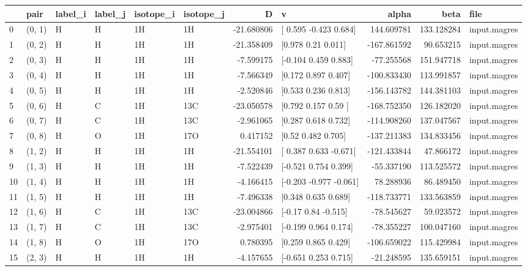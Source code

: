 \begin{tabular}{llllllrlrrl}
\toprule
 & pair & label_i & label_j & isotope_i & isotope_j & D & v & alpha & beta & file \\
\midrule
0 & (0, 1) & H & H & 1H & 1H & -21.680806 & [ 0.595 -0.423  0.684] & 144.609781 & 133.128284 & input.magres \\
1 & (0, 2) & H & H & 1H & 1H & -21.358409 & [0.978 0.21  0.011] & -167.861592 & 90.653215 & input.magres \\
2 & (0, 3) & H & H & 1H & 1H & -7.599175 & [-0.104  0.459  0.883] & -77.255568 & 151.947718 & input.magres \\
3 & (0, 4) & H & H & 1H & 1H & -7.566349 & [0.172 0.897 0.407] & -100.833430 & 113.991857 & input.magres \\
4 & (0, 5) & H & H & 1H & 1H & -2.520846 & [0.533 0.236 0.813] & -156.143782 & 144.381103 & input.magres \\
5 & (0, 6) & H & C & 1H & 13C & -23.050578 & [0.792 0.157 0.59 ] & -168.752350 & 126.182020 & input.magres \\
6 & (0, 7) & H & C & 1H & 13C & -2.961065 & [0.287 0.618 0.732] & -114.908260 & 137.047567 & input.magres \\
7 & (0, 8) & H & O & 1H & 17O & 0.417152 & [0.52  0.482 0.705] & -137.211383 & 134.833456 & input.magres \\
8 & (1, 2) & H & H & 1H & 1H & -21.554101 & [ 0.387  0.633 -0.671] & -121.433844 & 47.866172 & input.magres \\
9 & (1, 3) & H & H & 1H & 1H & -7.522439 & [-0.521  0.754  0.399] & -55.337190 & 113.525572 & input.magres \\
10 & (1, 4) & H & H & 1H & 1H & -4.166415 & [-0.203 -0.977 -0.061] & 78.288936 & 86.489450 & input.magres \\
11 & (1, 5) & H & H & 1H & 1H & -7.496338 & [0.348 0.635 0.689] & -118.733771 & 133.563859 & input.magres \\
12 & (1, 6) & H & C & 1H & 13C & -23.004866 & [-0.17   0.84  -0.515] & -78.545627 & 59.023572 & input.magres \\
13 & (1, 7) & H & C & 1H & 13C & -2.975401 & [-0.199  0.964  0.174] & -78.355227 & 100.047160 & input.magres \\
14 & (1, 8) & H & O & 1H & 17O & 0.780395 & [0.259 0.865 0.429] & -106.659022 & 115.429984 & input.magres \\
15 & (2, 3) & H & H & 1H & 1H & -4.157655 & [-0.651  0.253  0.715] & -21.248595 & 135.659151 & input.magres \\

\end{tabular}
